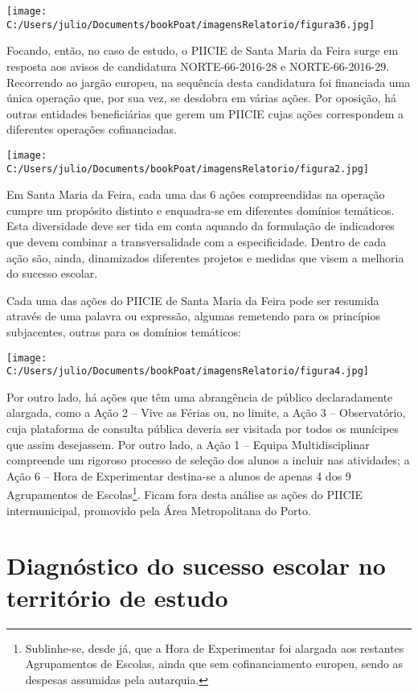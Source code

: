 \documentclass[
]{book}
\begin{document}
\texttt{[image: C:/Users/julio/Documents/bookPoat/imagensRelatorio/figura36.jpg]}

Focando, então, no caso de estudo, o PIICIE de Santa Maria da Feira surge em resposta aos avisos de candidatura NORTE-66-2016-28 e NORTE-66-2016-29. Recorrendo ao jargão europeu, na sequência desta candidatura foi financiada uma única operação que, por sua vez, se desdobra em várias ações. Por oposição, há outras entidades beneficiárias que gerem um PIICIE cujas ações correspondem a diferentes operações cofinanciadas.

\texttt{[image: C:/Users/julio/Documents/bookPoat/imagensRelatorio/figura2.jpg]}

Em Santa Maria da Feira, cada uma das 6 ações compreendidas na operação cumpre um propósito distinto e enquadra-se em diferentes domínios temáticos. Esta diversidade deve ser tida em conta aquando da formulação de indicadores que devem combinar a transversalidade com a especificidade. Dentro de cada ação são, ainda, dinamizados diferentes projetos e medidas que visem a melhoria do sucesso escolar.

Cada uma das ações do PIICIE de Santa Maria da Feira pode ser resumida através de uma palavra ou expressão, algumas remetendo para os princípios subjacentes, outras para os domínios temáticos:

\texttt{[image: C:/Users/julio/Documents/bookPoat/imagensRelatorio/figura4.jpg]}

Por outro lado, há ações que têm uma abrangência de público declaradamente alargada, como a Ação 2 -- Vive as Férias ou, no limite, a Ação 3 -- Observatório, cuja plataforma de consulta pública deveria ser visitada por todos os munícipes que assim desejassem. Por outro lado, a Ação 1 -- Equipa Multidisciplinar compreende um rigoroso processo de seleção dos alunos a incluir nas atividades; a Ação 6 -- Hora de Experimentar destina-se a alunos de apenas 4 dos 9 Agrupamentos de Escolas\footnote{Sublinhe-se, desde já, que a Hora de Experimentar foi alargada aos restantes Agrupamentos de Escolas, ainda que sem cofinanciamento europeu, sendo as despesas assumidas pela autarquia.}. Ficam fora desta análise as ações do PIICIE intermunicipal, promovido pela Área Metropolitana do Porto.

\hypertarget{diagnuxf3stico-do-sucesso-escolar-no-territuxf3rio-de-estudo}{%
\chapter{\texorpdfstring{\textbf{Diagnóstico do sucesso escolar no território de estudo}}{Diagnóstico do sucesso escolar no território de estudo}}\label{diagnuxf3stico-do-sucesso-escolar-no-territuxf3rio-de-estudo}}
\end{document}
